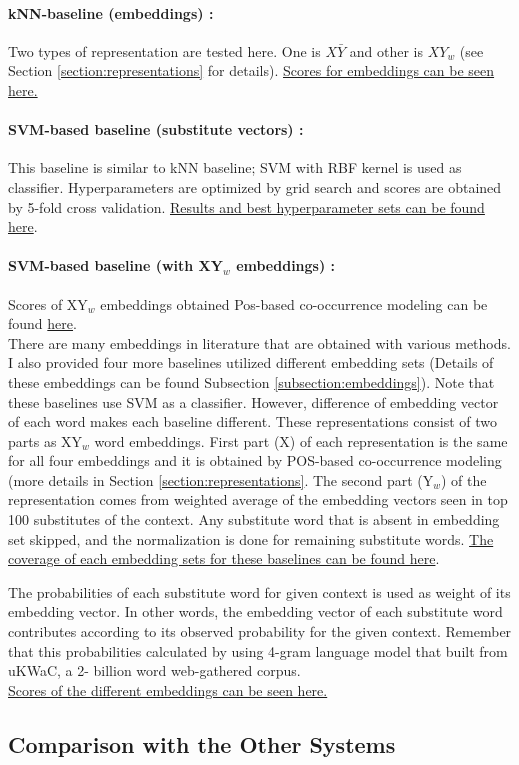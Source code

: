 \paragraph{kNN-baseline (embeddings) :} Two types of representation are tested here. One is $X\bar{Y}$ and other is $XY_w$ (see Section \ref{section:representations} for details). \href{https://goo.gl/010sp5}{Scores for embeddings can be seen here.} 
\paragraph{SVM-based baseline (substitute vectors) :} This baseline is similar to kNN baseline; SVM with RBF kernel is used as classifier. Hyperparameters are optimized by grid search and scores are obtained by 5-fold cross validation. \href{https://goo.gl/i43T1U}{Results and best hyperparameter sets can be found here}.
\paragraph{SVM-based baseline (with XY$_w$ embeddings) :} Scores of XY$_w$ embeddings obtained Pos-based co-occurrence modeling can be found \href{https://goo.gl/Zofhfm}{here}. \\


There are many embeddings in literature that are obtained with various methods. I also provided four more baselines utilized different embedding sets (Details of these embeddings can be found Subsection \ref{subsection:embeddings}). Note that these baselines use SVM as a classifier. However, difference of embedding vector of each word makes each baseline different. These representations consist of two parts as XY$_w$ word embeddings. First part (X) of each representation is the same for all four embeddings and it is obtained by POS-based co-occurrence modeling (more details in Section \ref{section:representations}. The second part (Y$_w$) of the representation comes from weighted average of the embedding vectors seen in top 100 substitutes of the context. Any substitute word that is absent in embedding set skipped, and the normalization is done for remaining substitute words. \href{https://goo.gl/Tcym7B}{The coverage of each embedding sets for these baselines can be found here}.

The probabilities of each substitute word for given context is used as weight of its embedding vector. In other words, the embedding vector of each substitute word contributes according to its observed probability for the given context. Remember that this probabilities calculated by using 4-gram language model that built from uKWaC, a 2- billion word web-gathered corpus.  \\

\href{https://goo.gl/Tcym7B}{Scores of the different embeddings can be seen here.}

\subsection{Comparison with the Other Systems}